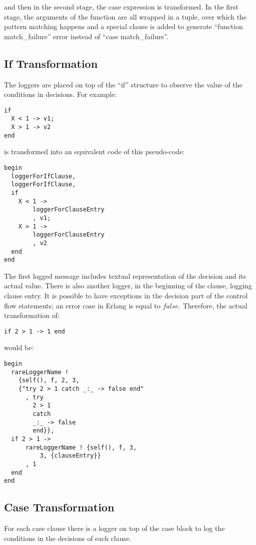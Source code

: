 \documentclass[12pt,a4paper]{report}
\begin{document}
and then in the second stage, the case expression is transformed. In the first stage, the arguments of the function are all wrapped in a tuple, over which the pattern matching happens and a special clause is added to generate ``function match\_failure'' error instead of ``case match\_failure''.

\subsection{If Transformation}
The loggers are placed on top of the ``if'' structure to observe the value of the conditions in decisions. For example:

\begin{lstlisting}
if 
  X < 1 -> v1;
  X > 1 -> v2
end 
\end{lstlisting}

is transformed into an equivalent code of this pseudo-code:

\begin{lstlisting}
begin
  loggerForIfClause,
  loggerForIfClause,  
  if 
    X < 1 ->
	    loggerForClauseEntry
	    , v1;
    X > 1 ->
	    loggerForClauseEntry
	    , v2
  end
end 
\end{lstlisting}

The first logged message includes textual representation of the decision and its actual value. There is also another logger, in the beginning of the clause, logging clause entry. It is possible to have exceptions in the decision part of the control flow statements; an error case in Erlang is equal to $false$. Therefore, the actual transformation of:

\begin{lstlisting}
if 2 > 1 -> 1 end
\end{lstlisting}

would be:

\begin{lstlisting}
begin
  rareLoggerName !
    {self(), f, 2, 3,
	{"try 2 > 1 catch _:_ -> false end"
	  , try 	
		2 > 1 
	    catch 
		_:_ -> false 
	    end}},
  if 2 > 1 ->
      rareLoggerName ! {self(), f, 3,
	      3, {clauseEntry}}
      , 1
  end
end 
\end{lstlisting}

\subsection{Case Transformation}
For each case clause there is a logger on top of the case block to log the conditions in the decisions of each clause.
 
\end{document}
